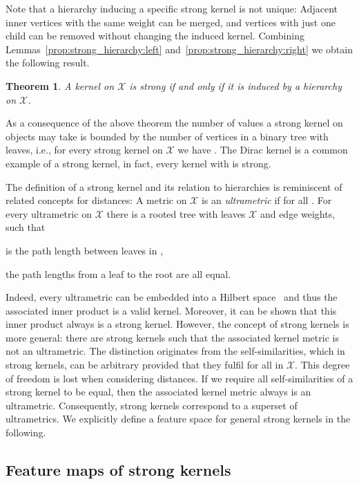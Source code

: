 \documentclass{article}
\newtheorem{theorem}{Theorem}
\newcommand{\X}{\ensuremath{\mathcal{X}}\xspace}
\begin{document}
Note that a hierarchy inducing a specific strong kernel is not unique: 
Adjacent inner vertices with the same weight can be merged, and vertices with 
just one child can be removed without changing the induced kernel. 
Combining Lemmas~\ref{prop:strong_hierarchy:left} and~\ref{prop:strong_hierarchy:right}
we obtain the following result.
\begin{theorem}\label{thm:strong_hierarchy}
 A kernel  on \X is strong if and only if it is induced by a hierarchy on \X.
\end{theorem}

As a consequence of the above theorem the number of values a strong kernel 
on  objects may take is bounded by the number of vertices in a binary tree 
with  leaves, i.e., for every strong kernel  on \X we have .
The Dirac kernel is a common example of a strong kernel, in fact, every kernel 
 with  is strong.

The definition of a strong kernel and its relation to hierarchies is reminiscent 
of related concepts for distances: A metric  on \X is an \emph{ultrametric}
if  for all . 
For every ultrametric  on \X there is a rooted tree  with leaves \X and 
edge weights, such that 
\begin{inparaenum}[(i)]
 \item  is the path length between leaves in ,
 \item the path lengths from a leaf to the root are all equal.
\end{inparaenum}
Indeed, every ultrametric can be embedded into a Hilbert space~\cite{Ismagilov1997}
and thus the associated inner product is a valid kernel. 
Moreover, it can be shown that this inner product always is a strong kernel.
However, the concept of strong kernels is more general: there are strong kernels 
 such that the associated kernel metric 
is not an ultrametric.
The distinction originates from the self-similarities, which in strong kernels, 
can be arbitrary provided that they fulfil 
for all  in \X. 
This degree of freedom is lost when considering distances. 
If we require all self-similarities of a strong kernel to be equal, then the 
associated kernel metric always is an ultrametric.
Consequently, strong kernels correspond to a superset of ultrametrics.
We explicitly define a feature space for general strong kernels in the following.



\subsection{Feature maps of strong kernels}\label{sec:strong:feature_maps}
\end{document}
